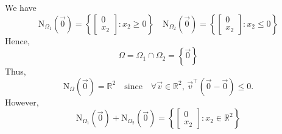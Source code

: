 \documentclass{article}
\newcommand{\R}{\mathbb{R}}
\begin{document}
We have
\[
    \text{N}_{\Omega_1}\left(\vec{0}\right) = \left\{\begin{bmatrix}
    0 \\ x_2 \end{bmatrix} : x_2 \geq 0\right\} \quad  \text{N}_{\Omega_2}\left(\vec{0}\right) = \left\{\begin{bmatrix}
    0 \\ x_2 \end{bmatrix} : x_2 \leq 0\right\}
\]
Hence,
\[
    \Omega = \Omega_1 \cap \Omega_2 = \left\{\vec{0}\right\}
\]
Thus,
\[
    \text{N}_{\Omega}\left(\vec{0}\right) = \R^2 \quad \text{since} \quad \forall \vec{v} \in \R^2,\, \vec{v}^\top\left(\vec{0} - \vec{0}\right) \leq 0.
\]
However,
\[
    \text{N}_{\Omega_1}\left(\vec{0}\right) + \text{N}_{\Omega_2}\left(\vec{0}\right) = \left\{\begin{bmatrix}
        0 \\ x_2 \end{bmatrix} : x_2 \in \R^2\right\}
\]
\end{document}
